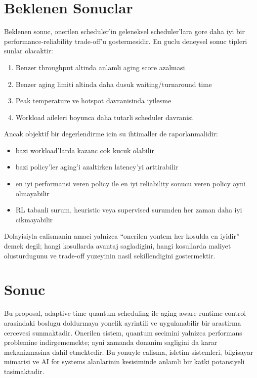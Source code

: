\documentclass[12pt,a4paper]{article}
\begin{document}
\section{Beklenen Sonuclar}

Beklenen sonuc, onerilen scheduler'in geleneksel scheduler'lara gore daha iyi bir performance-reliability
trade-off'u gostermesidir. En guclu deneysel sonuc tipleri sunlar olacaktir:

\begin{enumerate}[leftmargin=*]
\item Benzer throughput altinda anlamli aging score azalmasi
\item Benzer aging limiti altinda daha dusuk waiting/turnaround time
\item Peak temperature ve hotspot davranisinda iyilesme
\item Workload aileleri boyunca daha tutarli scheduler davranisi
\end{enumerate}

Ancak objektif bir degerlendirme icin su ihtimaller de raporlanmalidir:

\begin{itemize}[leftmargin=*]
\item bazi workload'larda kazanc cok kucuk olabilir
\item bazi policy'ler aging'i azaltirken latency'yi arttirabilir
\item en iyi performansi veren policy ile en iyi reliability sonucu veren policy ayni olmayabilir
\item RL tabanli surum, heuristic veya supervised surumden her zaman daha iyi cikmayabilir
\end{itemize}

Dolayisiyla calismanin amaci yalnizca ``onerilen yontem her kosulda en iyidir'' demek degil; hangi kosullarda avantaj
sagladigini, hangi kosullarda maliyet olusturdugunu ve trade-off yuzeyinin nasil sekillendigini gostermektir.

\section{Sonuc}

Bu proposal, adaptive time quantum scheduling ile aging-aware runtime control arasindaki boslugu doldurmaya yonelik
ayrintili ve uygulanabilir bir arastirma cercevesi sunmaktadir. Onerilen sistem, quantum secimini yalnizca performans
problemine indirgememekte; ayni zamanda donanim sagligini da karar mekanizmasina dahil etmektedir. Bu yonuyle calisma,
isletim sistemleri, bilgisayar mimarisi ve AI for systems alanlarinin kesisiminde anlamli bir katki potansiyeli tasimaktadir.
\end{document}
